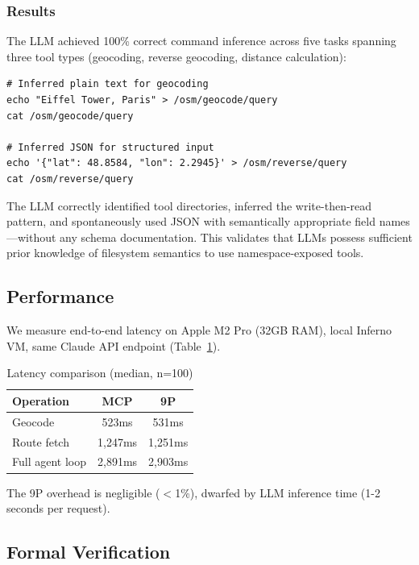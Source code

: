 \documentclass[acmsmall,screen,review]{acmart}
\begin{document}
\subsubsection{Results}

The LLM achieved 100\% correct command inference across five tasks spanning three tool types (geocoding, reverse geocoding, distance calculation):

\begin{lstlisting}[caption={LLM-generated commands from namespace alone}]
# Inferred plain text for geocoding
echo "Eiffel Tower, Paris" > /osm/geocode/query
cat /osm/geocode/query

# Inferred JSON for structured input
echo '{"lat": 48.8584, "lon": 2.2945}' > /osm/reverse/query
cat /osm/reverse/query
\end{lstlisting}

The LLM correctly identified tool directories, inferred the write-then-read pattern, and spontaneously used JSON with semantically appropriate field names---without any schema documentation. This validates that LLMs possess sufficient prior knowledge of filesystem semantics to use namespace-exposed tools.

\subsection{Performance}

We measure end-to-end latency on Apple M2 Pro (32GB RAM), local Inferno VM, same Claude API endpoint (Table~\ref{tab:latency}).

\begin{table}[h]
\centering
\begin{tabular}{lcc}
\hline
\textbf{Operation} & \textbf{MCP} & \textbf{9P} \\
\hline
Geocode & 523ms & 531ms \\
Route fetch & 1,247ms & 1,251ms \\
Full agent loop & 2,891ms & 2,903ms \\
\hline
\end{tabular}
\caption{Latency comparison (median, n=100)}
\label{tab:latency}
\end{table}

The 9P overhead is negligible ($<$1\%), dwarfed by LLM inference time (1-2 seconds per request).

\subsection{Formal Verification}
\end{document}
